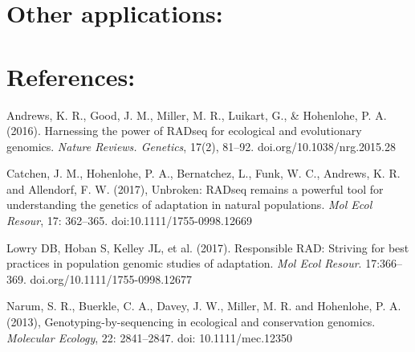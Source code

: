 \documentclass{article}
\begin{document}
\section{Other applications:}
\section{References:}


Andrews, K. R., Good, J. M., Miller, M. R., Luikart, G., \& Hohenlohe, P. A. (2016). Harnessing the power of RADseq for ecological and evolutionary genomics. \emph{Nature Reviews. Genetics}, 17(2), 81–92. doi.org/10.1038/nrg.2015.28

Catchen, J. M., Hohenlohe, P. A., Bernatchez, L., Funk, W. C., Andrews, K. R. and Allendorf, F. W. (2017), Unbroken: RADseq remains a powerful tool for understanding the genetics of adaptation in natural populations. \emph{Mol Ecol Resour}, 17: 362–365. doi:10.1111/1755-0998.12669

Lowry DB, Hoban S, Kelley JL, et al. (2017). Responsible RAD: Striving for best practices in population genomic studies of adaptation. \emph{Mol Ecol Resour}. 17:366–369. doi.org/10.1111/1755-0998.12677

Narum, S. R., Buerkle, C. A., Davey, J. W., Miller, M. R. and Hohenlohe, P. A. (2013), Genotyping-by-sequencing in ecological and conservation genomics. \emph{Molecular Ecology}, 22: 2841–2847. doi: 10.1111/mec.12350
\end{document}
